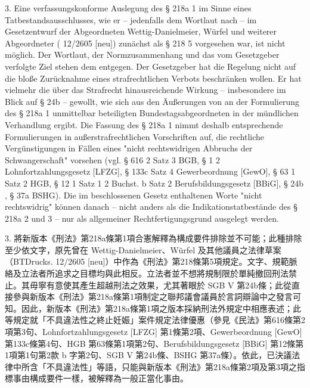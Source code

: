\documentclass[12pt]{article}
\begin{document}
\begin{sourcepara}[title={原文E.164}]
3. Eine verfassungskonforme Auslegung des § 218a \abbrAbs{} 1 \abbrStGB{} \abbrNF{} im Sinne eines Tatbestandsausschlusses, wie er -- jedenfalls dem Wortlaut nach -- im Gesetzentwurf der Abgeordneten Wettig-Danielmeier, Würfel und weiterer Abgeordneter (\abbrBTDrucks{} 12/2605 [neu]) zunächst als § 218 \abbrAbs{} 5 \abbrStGB{} vorgesehen war, ist nicht möglich. Der Wortlaut, der Normzusammenhang und das vom Gesetzgeber verfolgte Ziel stehen dem entgegen. Der Gesetzgeber hat die Regelung nicht auf die bloße Zurücknahme eines strafrechtlichen Verbots beschränken wollen. Er hat vielmehr die über das Strafrecht hinausreichende Wirkung -- insbesondere im Blick auf § 24b \abbrSGBV{} -- gewollt, wie sich aus den Äußerungen von an der Formulierung des § 218a \abbrAbs{} 1 \abbrStGB{} \abbrNF{} unmittelbar beteiligten Bundestagsabgeordneten in der mündlichen Verhandlung ergibt. Die Fassung des § 218a \abbrAbs{} 1 \abbrStGB{} \abbrNF{} nimmt deshalb entsprechende Formulierungen in außerstrafrechtlichen Vorschriften auf, die rechtliche Vergünstigungen in Fällen eines "nicht rechtswidrigen Abbruchs der Schwangerschaft" vorsehen (vgl. § 616 \abbrAbs{} 2 Satz 3 BGB, § 1 \abbrAbs{} 2 Lohnfortzahlungsgesetz [LFZG], § 133c Satz 4 Gewerbeordnung [GewO], § 63 \abbrAbs{} 1 Satz 2 HGB, § 12 \abbrAbs{} 1 Satz 1 \abbrNr{} 2 Buchst. b Satz 2 Berufsbildungsgesetz [BBiG], § 24b \abbrSGBV{}, § 37a BSHG). Die im beschlossenen Gesetz enthaltenen Worte "nicht rechtswidrig" können danach -- nicht anders als die Indikationstatbestände des § 218a \abbrAbs{} 2 und 3 \abbrStGB{} \abbrNF{} -- nur als allgemeiner Rechtfertigungsgrund ausgelegt werden.
\end{sourcepara}
\begin{transpara}
3. 將新版本《刑法》第218a條第1項合憲解釋為構成要件排除並不可能；此種排除至少依文字，原先曾在 Wettig-Danielmeier、Würfel 及其他議員之法律草案（BTDrucks. 12/2605 [neu]）中作為《刑法》第218條第5項規定。文字、規範脈絡及立法者所追求之目標均與此相反。立法者並不想將規制限於單純撤回刑法禁止。其毋寧有意使其產生超越刑法之效果，尤其著眼於 SGB V 第24b條；此從直接參與新版本《刑法》第218a條第1項制定之聯邦議會議員於言詞辯論中之發言可知。因此，新版本《刑法》第218a條第1項之版本採納刑法外規定中相應表述；此等規定就「不具違法性之終止妊娠」案件規定法律優惠（參見《民法》第616條第2項第3句、Lohnfortzahlungsgesetz [LFZG] 第1條第2項、Gewerbeordnung [GewO] 第133c條第4句、HGB 第63條第1項第2句、Berufsbildungsgesetz [BBiG] 第12條第1項第1句第2款 b 字第2句、SGB V 第24b條、BSHG 第37a條）。依此，已決議法律中所含「不具違法性」等語，只能與新版本《刑法》第218a條第2項及第3項之指標事由構成要件一樣，被解釋為一般正當化事由。
\end{transpara}
\end{document}
